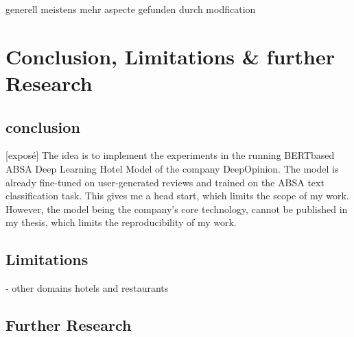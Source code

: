 generell meistens mehr aspecte gefunden durch modfication


\section{Conclusion, Limitations \& further Research}

\subsection{conclusion}
[exposé]
The idea is to implement the experiments in the running BERTbased ABSA Deep Learning Hotel Model of the company DeepOpinion. The model is already fine-tuned on user-generated reviews and trained on the ABSA text classification task. This gives me a head start, which limits the scope of my work. However, the model being the company's core technology, cannot be published in my thesis, which limits the reproducibility of my work.


\subsection{Limitations}

- other domains hotels and restaurants


\subsection{Further Research}





\FloatBarrier


